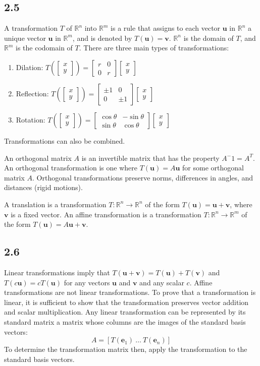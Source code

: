 \documentclass{article}
\newcommand{\colvec}{\begin{bmatrix} x \\ y \end{bmatrix}}
\begin{document}
    \subsection*{2.5}
    A transformation $T$ of $\mathbb{R}^n$ into $\mathbb{R}^m$ is a rule that assigns to each vector $\mathbf{u}$ in $\mathbb{R}^n$
    a unique vector $\mathbf{u}$ in $\mathbb{R}^m$, and is denoted by $T(\mathbf{u}) = \mathbf{v}$.
    $\mathbb{R}^n$ is the domain of $T$, and $\mathbb{R}^m$ is the codomain of $T$.
    There are three main types of transformations:
    \begin{enumerate}
        \item Dilation: $T(\colvec) = \begin{bmatrix} r & 0 \\ 0 & r \end{bmatrix}\colvec$
        \item Reflection: $T(\colvec) = \begin{bmatrix} \pm1 & 0 \\ 0 & \pm1 \end{bmatrix}\colvec$
        \item Rotation: $T(\colvec) = \begin{bmatrix} \cos\theta & -\sin\theta \\ \sin\theta & \cos\theta \end{bmatrix}\colvec$
    \end{enumerate}
    Transformations can also be combined. 

    An orthogonal matrix $A$ is an invertible matrix that has the property $A^-1 = A^T$.
    An orthogonal transformation is one where $T(\mathbf{u}) = A\mathbf{u}$ for some orthogonal matrix $A$.
    Orthogonal transformations preserve norms, differences in angles, and distances (rigid motions).

    A translation is a transformation $T: \mathbb{R}^n \rightarrow \mathbb{R}^n$ of the form 
    $T(\mathbf{u}) = \mathbf{u} + \mathbf{v}$, where $\mathbf{v}$ is a fixed vector.
    An affine transformation is a transformation $T: \mathbb{R}^n \rightarrow \mathbb{R}^m$ of the form
    $T(\mathbf{u}) = A \mathbf{u} + \mathbf{v}$. 

    \subsection*{2.6}
    Linear transformations imply that $T(\mathbf{u} + \mathbf{v}) = T(\mathbf{u}) + T(\mathbf{v})$ and
    $T(c\mathbf{u}) = cT(\mathbf{u})$ for any vectors $\mathbf{u}$ and $\mathbf{v}$ and any scalar $c$.
    Affine transformations are not linear transformations.
    To prove that a transformation is linear, it is sufficient to show that the transformation preserves vector addition and scalar multiplication.
    Any linear transformation can be represented by its standard matrix
    a matrix whose columns are the images of the standard basis vectors: 
    \[A = [T(\mathbf{e}_1) \ \dots \ T(\mathbf{e}_n)]\]
    To determine the transformation matrix then, apply the transformation to the standard basis vectors.
    
\end{document}
